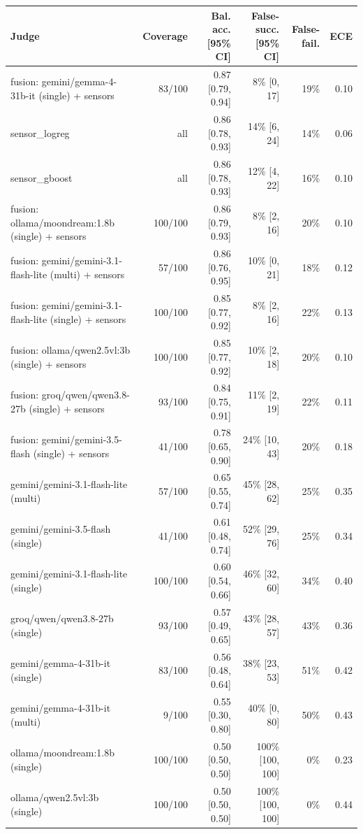 \begin{tabular}{lrrrrr}
\toprule
Judge & Coverage & Bal. acc. [95\% CI] & False-succ. [95\% CI] & False-fail. & ECE \\
\midrule
fusion: gemini/gemma-4-31b-it (single) + sensors & 83/100 & 0.87 [0.79, 0.94] & 8\% [0, 17] & 19\% & 0.10 \\
sensor\_logreg & all & 0.86 [0.78, 0.93] & 14\% [6, 24] & 14\% & 0.06 \\
sensor\_gboost & all & 0.86 [0.78, 0.93] & 12\% [4, 22] & 16\% & 0.10 \\
fusion: ollama/moondream:1.8b (single) + sensors & 100/100 & 0.86 [0.79, 0.93] & 8\% [2, 16] & 20\% & 0.10 \\
fusion: gemini/gemini-3.1-flash-lite (multi) + sensors & 57/100 & 0.86 [0.76, 0.95] & 10\% [0, 21] & 18\% & 0.12 \\
fusion: gemini/gemini-3.1-flash-lite (single) + sensors & 100/100 & 0.85 [0.77, 0.92] & 8\% [2, 16] & 22\% & 0.13 \\
fusion: ollama/qwen2.5vl:3b (single) + sensors & 100/100 & 0.85 [0.77, 0.92] & 10\% [2, 18] & 20\% & 0.10 \\
fusion: groq/qwen/qwen3.8-27b (single) + sensors & 93/100 & 0.84 [0.75, 0.91] & 11\% [2, 19] & 22\% & 0.11 \\
fusion: gemini/gemini-3.5-flash (single) + sensors & 41/100 & 0.78 [0.65, 0.90] & 24\% [10, 43] & 20\% & 0.18 \\
gemini/gemini-3.1-flash-lite (multi) & 57/100 & 0.65 [0.55, 0.74] & 45\% [28, 62] & 25\% & 0.35 \\
gemini/gemini-3.5-flash (single) & 41/100 & 0.61 [0.48, 0.74] & 52\% [29, 76] & 25\% & 0.34 \\
gemini/gemini-3.1-flash-lite (single) & 100/100 & 0.60 [0.54, 0.66] & 46\% [32, 60] & 34\% & 0.40 \\
groq/qwen/qwen3.8-27b (single) & 93/100 & 0.57 [0.49, 0.65] & 43\% [28, 57] & 43\% & 0.36 \\
gemini/gemma-4-31b-it (single) & 83/100 & 0.56 [0.48, 0.64] & 38\% [23, 53] & 51\% & 0.42 \\
gemini/gemma-4-31b-it (multi) & 9/100 & 0.55 [0.30, 0.80] & 40\% [0, 80] & 50\% & 0.43 \\
ollama/moondream:1.8b (single) & 100/100 & 0.50 [0.50, 0.50] & 100\% [100, 100] & 0\% & 0.23 \\
ollama/qwen2.5vl:3b (single) & 100/100 & 0.50 [0.50, 0.50] & 100\% [100, 100] & 0\% & 0.44 \\
\bottomrule
\end{tabular}